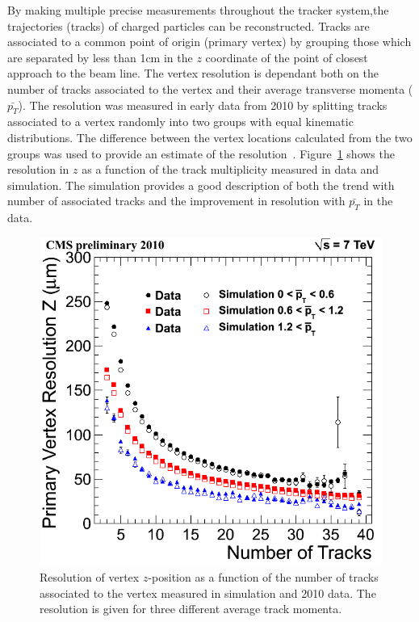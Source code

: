By making multiple precise measurements throughout the tracker system,the trajectories (tracks) of charged 
particles can be reconstructed.
Tracks are associated to a common point of origin (primary vertex) by grouping those which are separated
by less than 1cm in the $z$ coordinate of the point of closest approach to the beam line.
The vertex resolution is dependant both on the number of tracks associated to the vertex and
their average transverse momenta ($\bar{p_{T}}$). The resolution was measured in early data from 2010
by splitting tracks associated to a vertex randomly into two groups with equal kinematic distributions.
The difference between the vertex locations calculated from the two groups was used to provide an estimate 
of the resolution~\cite{TRK-10-005}.
Figure~\ref{fig:vtxreso} shows the resolution in $z$ as a function of the track multiplicity
measured in data and simulation. The simulation provides a good description of both the trend with 
number of associated tracks and the improvement in resolution with $\bar{p_{T}}$ in the data. 

\begin{figure}
\begin{center}
	\includegraphics[width=.6\textwidth]{detector/trcker/zresotrcker.png}
	\caption{Resolution of vertex $z$-position as a function of the number 
	of tracks associated to the vertex measured in simulation and 2010 data.
 	The resolution is given for three different average track momenta.}
	\label{fig:vtxreso}
\end{center}
\end{figure}

